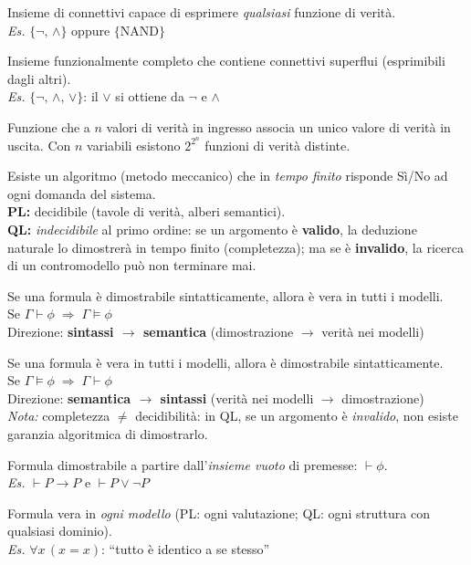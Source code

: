 \documentclass[10pt,a4paper]{article}
\begin{document}
{Insieme di connettivi capace di esprimere \emph{qualsiasi} funzione di verità.\\
\textit{Es.} $\{\lnot,\, \land\}$ oppure $\{\text{NAND}\}$}

{Insieme funzionalmente completo che contiene connettivi superflui (esprimibili dagli altri).\\
\textit{Es.} $\{\lnot,\, \land,\, \lor\}$: il $\lor$ si ottiene da $\lnot$ e $\land$}

{Funzione che a $n$ valori di verità in ingresso associa un unico valore di verità in uscita.
Con $n$ variabili esistono $2^{2^n}$ funzioni di verità distinte.}

{Esiste un algoritmo (metodo meccanico) che in \emph{tempo finito} risponde Sì/No ad ogni domanda del sistema.\\
\textbf{PL:} decidibile (tavole di verità, alberi semantici).\\
\textbf{QL:} \emph{indecidibile} al primo ordine: se un argomento è \textbf{valido},
la deduzione naturale lo dimostrerà in tempo finito (completezza);
ma se è \textbf{invalido}, la ricerca di un contromodello può non terminare mai.}

{Se una formula è dimostrabile sintatticamente, allora è vera in tutti i modelli.\\
$\text{Se } \Gamma \vdash \phi \;\Longrightarrow\; \Gamma \vDash \phi$\\
Direzione: \textbf{sintassi $\to$ semantica} (dimostrazione $\to$ verità nei modelli)}

\newpage
{}
{Se una formula è vera in tutti i modelli, allora è dimostrabile sintatticamente.\\
$\text{Se } \Gamma \vDash \phi \;\Longrightarrow\; \Gamma \vdash \phi$\\
Direzione: \textbf{semantica $\to$ sintassi} (verità nei modelli $\to$ dimostrazione)\\
\textit{Nota:} completezza $\neq$ decidibilità: in QL, se un argomento è \emph{invalido},
non esiste garanzia algoritmica di dimostrarlo.}

{Formula dimostrabile a partire dall'\emph{insieme vuoto} di premesse: $\vdash \phi$.\\
\textit{Es.} $\vdash P \to P$ \quad e \quad $\vdash P \lor \lnot P$}

{Formula vera in \emph{ogni modello} (PL: ogni valutazione; QL: ogni struttura con qualsiasi dominio).\\
\textit{Es.} $\forall x\,(x{=}x)$: ``tutto è identico a se stesso''}
\end{document}
